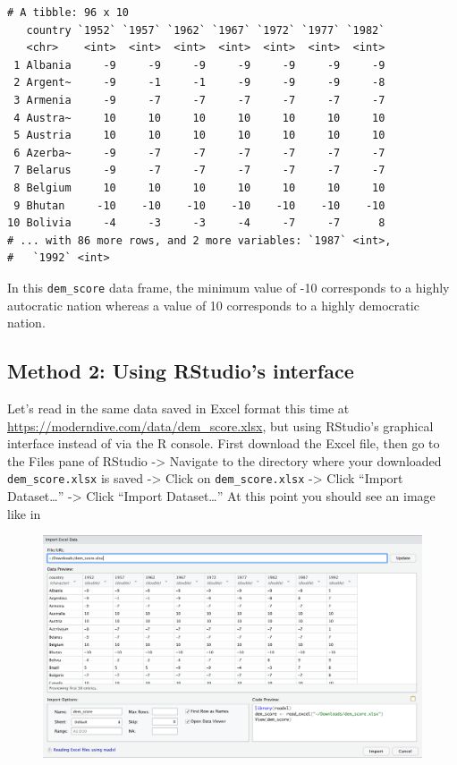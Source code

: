 \documentclass[12pt,]{krantz}
\theoremstyle{definition}
\theoremstyle{definition}
\theoremstyle{definition}
\theoremstyle{remark}
\begin{document}
\begin{verbatim}
# A tibble: 96 x 10
   country `1952` `1957` `1962` `1967` `1972` `1977` `1982`
   <chr>    <int>  <int>  <int>  <int>  <int>  <int>  <int>
 1 Albania     -9     -9     -9     -9     -9     -9     -9
 2 Argent~     -9     -1     -1     -9     -9     -9     -8
 3 Armenia     -9     -7     -7     -7     -7     -7     -7
 4 Austra~     10     10     10     10     10     10     10
 5 Austria     10     10     10     10     10     10     10
 6 Azerba~     -9     -7     -7     -7     -7     -7     -7
 7 Belarus     -9     -7     -7     -7     -7     -7     -7
 8 Belgium     10     10     10     10     10     10     10
 9 Bhutan     -10    -10    -10    -10    -10    -10    -10
10 Bolivia     -4     -3     -3     -4     -7     -7      8
# ... with 86 more rows, and 2 more variables: `1987` <int>,
#   `1992` <int>
\end{verbatim}

In this \texttt{dem\_score} data frame, the minimum value of -10
corresponds to a highly autocratic nation whereas a value of 10
corresponds to a highly democratic nation.

\subsection{Method 2: Using RStudio's
interface}\label{method-2-using-rstudios-interface}

Let's read in the same data saved in Excel format this time at
\url{https://moderndive.com/data/dem_score.xlsx}, but using RStudio's
graphical interface instead of via the R console. First download the
Excel file, then go to the Files pane of RStudio -\textgreater{}
Navigate to the directory where your downloaded \texttt{dem\_score.xlsx}
is saved -\textgreater{} Click on \texttt{dem\_score.xlsx}
-\textgreater{} Click ``Import Dataset\ldots{}'' -\textgreater{} Click
``Import Dataset\ldots{}'' At this point you should see an image like in

\begin{figure}
\centering
\includegraphics{images/read_excel.png}
\caption{}
\end{figure}
\end{document}
